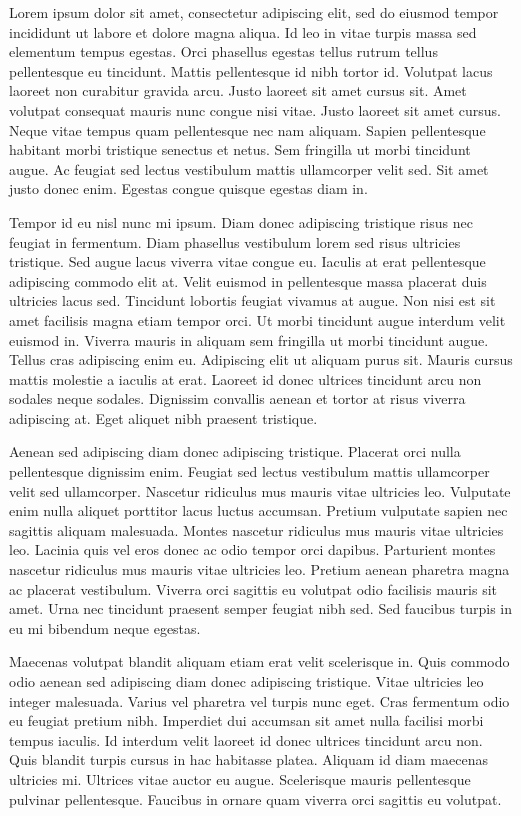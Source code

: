 Lorem ipsum dolor sit amet, consectetur adipiscing elit, sed do eiusmod tempor incididunt ut labore et dolore magna aliqua. Id leo in vitae turpis massa sed elementum tempus egestas. Orci phasellus egestas tellus rutrum tellus pellentesque eu tincidunt. Mattis pellentesque id nibh tortor id. Volutpat lacus laoreet non curabitur gravida arcu. Justo laoreet sit amet cursus sit. Amet volutpat consequat mauris nunc congue nisi vitae. Justo laoreet sit amet cursus. Neque vitae tempus quam pellentesque nec nam aliquam. Sapien pellentesque habitant morbi tristique senectus et netus. Sem fringilla ut morbi tincidunt augue. Ac feugiat sed lectus vestibulum mattis ullamcorper velit sed. Sit amet justo donec enim. Egestas congue quisque egestas diam in.

Tempor id eu nisl nunc mi ipsum. Diam donec adipiscing tristique risus nec feugiat in fermentum. Diam phasellus vestibulum lorem sed risus ultricies tristique. Sed augue lacus viverra vitae congue eu. Iaculis at erat pellentesque adipiscing commodo elit at. Velit euismod in pellentesque massa placerat duis ultricies lacus sed. Tincidunt lobortis feugiat vivamus at augue. Non nisi est sit amet facilisis magna etiam tempor orci. Ut morbi tincidunt augue interdum velit euismod in. Viverra mauris in aliquam sem fringilla ut morbi tincidunt augue. Tellus cras adipiscing enim eu. Adipiscing elit ut aliquam purus sit. Mauris cursus mattis molestie a iaculis at erat. Laoreet id donec ultrices tincidunt arcu non sodales neque sodales. Dignissim convallis aenean et tortor at risus viverra adipiscing at. Eget aliquet nibh praesent tristique.

Aenean sed adipiscing diam donec adipiscing tristique. Placerat orci nulla pellentesque dignissim enim. Feugiat sed lectus vestibulum mattis ullamcorper velit sed ullamcorper. Nascetur ridiculus mus mauris vitae ultricies leo. Vulputate enim nulla aliquet porttitor lacus luctus accumsan. Pretium vulputate sapien nec sagittis aliquam malesuada. Montes nascetur ridiculus mus mauris vitae ultricies leo. Lacinia quis vel eros donec ac odio tempor orci dapibus. Parturient montes nascetur ridiculus mus mauris vitae ultricies leo. Pretium aenean pharetra magna ac placerat vestibulum. Viverra orci sagittis eu volutpat odio facilisis mauris sit amet. Urna nec tincidunt praesent semper feugiat nibh sed. Sed faucibus turpis in eu mi bibendum neque egestas.

Maecenas volutpat blandit aliquam etiam erat velit scelerisque in. Quis commodo odio aenean sed adipiscing diam donec adipiscing tristique. Vitae ultricies leo integer malesuada. Varius vel pharetra vel turpis nunc eget. Cras fermentum odio eu feugiat pretium nibh. Imperdiet dui accumsan sit amet nulla facilisi morbi tempus iaculis. Id interdum velit laoreet id donec ultrices tincidunt arcu non. Quis blandit turpis cursus in hac habitasse platea. Aliquam id diam maecenas ultricies mi. Ultrices vitae auctor eu augue. Scelerisque mauris pellentesque pulvinar pellentesque. Faucibus in ornare quam viverra orci sagittis eu volutpat.

